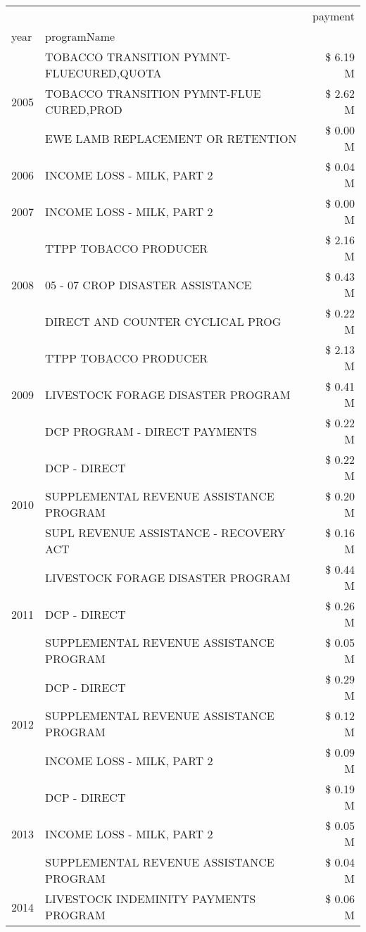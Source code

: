 \begin{tabular}{llr}
\toprule
 &  & payment \\
year & programName &  \\
\midrule
\multirow[t]{3}{*}{2005} & TOBACCO TRANSITION PYMNT-FLUECURED,QUOTA & \$ 6.19 M \\
 & TOBACCO TRANSITION PYMNT-FLUE CURED,PROD & \$ 2.62 M \\
 & EWE LAMB REPLACEMENT OR RETENTION & \$ 0.00 M \\
\cline{1-3}
2006 & INCOME LOSS - MILK, PART 2 & \$ 0.04 M \\
\cline{1-3}
2007 & INCOME LOSS - MILK, PART 2 & \$ 0.00 M \\
\cline{1-3}
\multirow[t]{3}{*}{2008} & TTPP TOBACCO PRODUCER & \$ 2.16 M \\
 & 05 - 07 CROP DISASTER ASSISTANCE & \$ 0.43 M \\
 & DIRECT AND COUNTER CYCLICAL PROG & \$ 0.22 M \\
\cline{1-3}
\multirow[t]{3}{*}{2009} & TTPP TOBACCO PRODUCER & \$ 2.13 M \\
 & LIVESTOCK FORAGE DISASTER  PROGRAM & \$ 0.41 M \\
 & DCP PROGRAM - DIRECT PAYMENTS & \$ 0.22 M \\
\cline{1-3}
\multirow[t]{3}{*}{2010} & DCP - DIRECT & \$ 0.22 M \\
 & SUPPLEMENTAL REVENUE ASSISTANCE PROGRAM & \$ 0.20 M \\
 & SUPL REVENUE ASSISTANCE - RECOVERY ACT & \$ 0.16 M \\
\cline{1-3}
\multirow[t]{3}{*}{2011} & LIVESTOCK FORAGE DISASTER PROGRAM & \$ 0.44 M \\
 & DCP - DIRECT & \$ 0.26 M \\
 & SUPPLEMENTAL REVENUE ASSISTANCE PROGRAM & \$ 0.05 M \\
\cline{1-3}
\multirow[t]{3}{*}{2012} & DCP - DIRECT & \$ 0.29 M \\
 & SUPPLEMENTAL REVENUE ASSISTANCE PROGRAM & \$ 0.12 M \\
 & INCOME LOSS - MILK, PART 2 & \$ 0.09 M \\
\cline{1-3}
\multirow[t]{3}{*}{2013} & DCP - DIRECT & \$ 0.19 M \\
 & INCOME LOSS - MILK, PART 2 & \$ 0.05 M \\
 & SUPPLEMENTAL REVENUE ASSISTANCE PROGRAM & \$ 0.04 M \\
\cline{1-3}
\multirow[t]{3}{*}{2014} & LIVESTOCK INDEMINITY PAYMENTS PROGRAM & \$ 0.06 M \\

\end{tabular}
